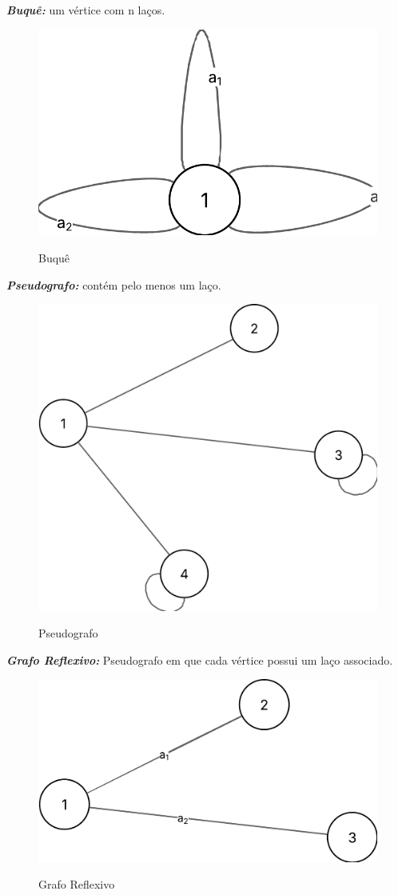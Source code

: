 \textit{\textbf{Buquê:}} um vértice com n laços.
\begin{figure} [H]
	\centering
	\caption{Buquê}%
	\label{fig:buquê}%
	\includegraphics[width=0.5\linewidth,angle=0]{figuras/tiposgrafos/buque.png}%
	\\
\end{figure}
\textit{\textbf{Pseudografo:}} contém pelo menos um laço. \\
\begin{figure} [H]
	\centering
	\caption{Pseudografo}%
	\label{fig:pseudografo}%
	\includegraphics[width=0.5\linewidth,angle=0]{figuras/tiposgrafos/pseudografo.png}%
	\\
\end{figure}
\textit{\textbf{Grafo Reflexivo:}} Pseudografo em que cada vértice possui um laço associado.\\
\begin{figure} [H]
	\centering
	\caption{Grafo Reflexivo}%
	\label{fig:grafReflex}%
	\includegraphics[width=0.5\linewidth,angle=0]{figuras/tiposgrafos/grafReflex.png}%
	\\
\end{figure}
